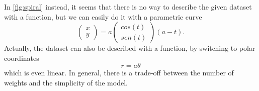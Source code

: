 In \cref{fig:spiral} instead, it seems that there is no way to describe the given dataset with a function, but we can easily do it with a parametric curve
\begin{equation}
	\begin{pmatrix}x\\y\end{pmatrix} = a\begin{pmatrix}cos(t)\\sen(t)\end{pmatrix}(a-t).
\end{equation}
Actually, the dataset can also be described with a function, by switching to polar coordinates
\begin{equation}
	r = a\theta 
\end{equation}
which is even linear. In general, there is a trade-off between the number of weights and the simplicity of the model.